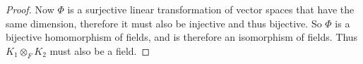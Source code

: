 \documentclass{article}
\begin{document}
\begin{proof}
    Now $\Phi$ is a surjective linear transformation of vector spaces that
    have the same dimension, therefore it must also be injective and thus
    bijective. So $\Phi$ is a bijective homomorphism of fields, and is
    therefore an isomorphism of fields. Thus $K_1\otimes_F K_2$ must also
    be a field.
  \end{proof}
\end{document}
